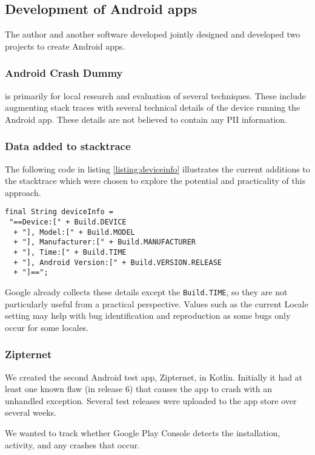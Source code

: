 \subsection{Development of Android apps}
The author and another software developed jointly designed and developed two projects to create Android apps. 
\subsubsection{Android Crash Dummy} is primarily for local research and evaluation of several techniques. These include augmenting stack traces with several technical details of the device running the Android app. These details are not believed to contain any PII information. 
\subsubsection{Data added to stacktrace}
The following code in listing \ref{listing:deviceinfo} illustrates the current additions to the stacktrace which were chosen to explore the potential and practicality of this approach. 

\begin{lstlisting}[caption=Sample code block,label=listing:deviceinfo]
final String deviceInfo = 
 "==Device:[" + Build.DEVICE
  + "], Model:[" + Build.MODEL
  + "], Manufacturer:[" + Build.MANUFACTURER
  + "], Time:[" + Build.TIME
  + "], Android Version:[" + Build.VERSION.RELEASE
  + "]==";

\end{lstlisting}
Google already collects these details except the \texttt{Build.TIME}, so they are not particularly useful from a practical perspective. Values such as the current Locale setting may help with bug identification and reproduction as some bugs only occur for some locales.

\subsubsection{Zipternet} 
We created the second Android test app, Zipternet\cite{zipternet_github}, in Kotlin. Initially it had at least one known flaw (in release 6) that causes the app to crash with an unhandled exception. Several test releases were uploaded to the app store over several weeks.

We wanted to track whether Google Play Console detects the installation, activity, and any crashes that occur.

